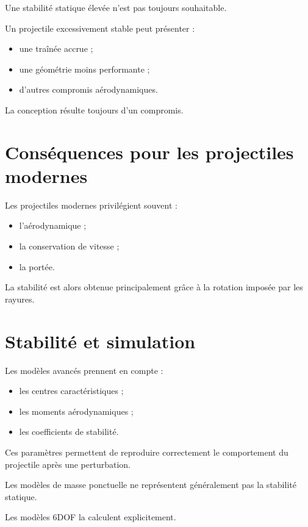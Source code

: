 Une stabilité statique élevée n'est pas toujours souhaitable.

Un projectile excessivement stable peut présenter :

\begin{itemize}
    \item une traînée accrue ;
    \item une géométrie moins performante ;
    \item d'autres compromis aérodynamiques.
\end{itemize}

La conception résulte toujours d'un compromis.

\section{Conséquences pour les projectiles modernes}

Les projectiles modernes privilégient souvent :

\begin{itemize}
    \item l'aérodynamique ;
    \item la conservation de vitesse ;
    \item la portée.
\end{itemize}

La stabilité est alors obtenue principalement grâce à la rotation imposée
par les rayures.

\section{Stabilité et simulation}

Les modèles avancés prennent en compte :

\begin{itemize}
    \item les centres caractéristiques ;
    \item les moments aérodynamiques ;
    \item les coefficients de stabilité.
\end{itemize}

Ces paramètres permettent de reproduire correctement le comportement du
projectile après une perturbation.

\begin{simulation}

Les modèles de masse ponctuelle ne représentent généralement pas la stabilité
statique.

Les modèles 6DOF la calculent explicitement.

\end{simulation}


